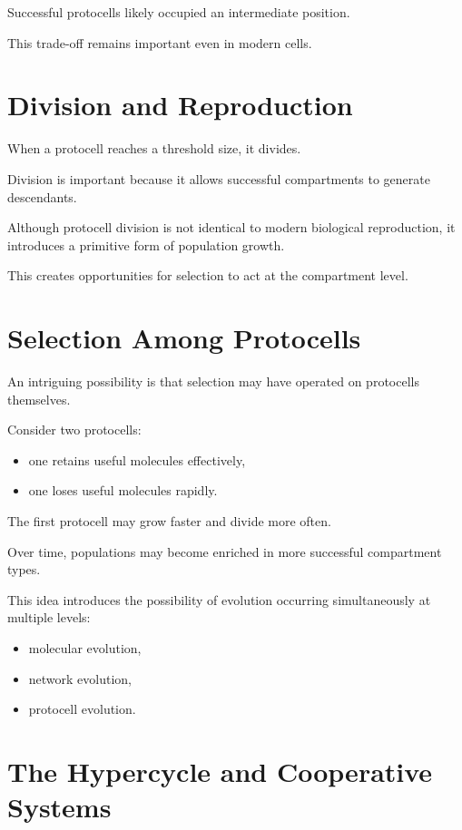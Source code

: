 \documentclass[
  oneside,
  openany]{book}
\providecommand{\tightlist}{%
  \setlength{\itemsep}{0pt}\setlength{\parskip}{0pt}}
\begin{document}
Successful protocells likely occupied an intermediate position.

This trade-off remains important even in modern cells.

\section{Division and Reproduction}\label{division-and-reproduction}

When a protocell reaches a threshold size, it divides.

Division is important because it allows successful compartments to generate descendants.

Although protocell division is not identical to modern biological reproduction, it introduces a primitive form of population growth.

This creates opportunities for selection to act at the compartment level.

\section{Selection Among Protocells}\label{selection-among-protocells}

An intriguing possibility is that selection may have operated on protocells themselves.

Consider two protocells:

\begin{itemize}
\tightlist
\item
  one retains useful molecules effectively,
\item
  one loses useful molecules rapidly.
\end{itemize}

The first protocell may grow faster and divide more often.

Over time, populations may become enriched in more successful compartment types.

This idea introduces the possibility of evolution occurring simultaneously at multiple levels:

\begin{itemize}
\tightlist
\item
  molecular evolution,
\item
  network evolution,
\item
  protocell evolution.
\end{itemize}

\section{The Hypercycle and Cooperative Systems}\label{the-hypercycle-and-cooperative-systems}
\end{document}
